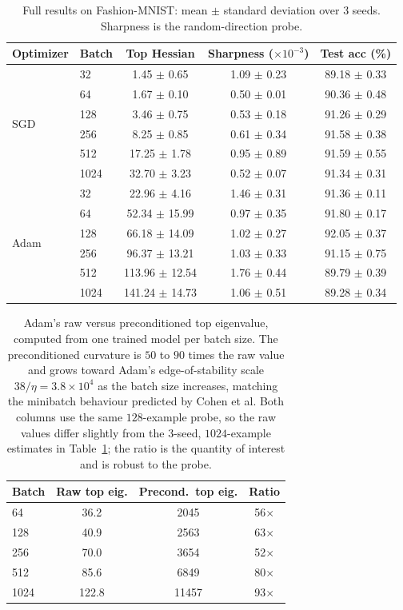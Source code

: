 \documentclass[a4paper,10pt,twoside]{article}
\begin{document}
\begin{table}[h]
\centering
\small
\begin{tabular}{llccc}
\toprule
Optimizer & Batch & Top Hessian & Sharpness ($\times10^{-3}$) & Test acc (\%) \\
\midrule
\multirow{6}{*}{SGD}
 & 32 & 1.45 $\pm$ 0.65 & 1.09 $\pm$ 0.23 & 89.18 $\pm$ 0.33 \\
 & 64 & 1.67 $\pm$ 0.10 & 0.50 $\pm$ 0.01 & 90.36 $\pm$ 0.48 \\
 & 128 & 3.46 $\pm$ 0.75 & 0.53 $\pm$ 0.18 & 91.26 $\pm$ 0.29 \\
 & 256 & 8.25 $\pm$ 0.85 & 0.61 $\pm$ 0.34 & 91.58 $\pm$ 0.38 \\
 & 512 & 17.25 $\pm$ 1.78 & 0.95 $\pm$ 0.89 & 91.59 $\pm$ 0.55 \\
 & 1024 & 32.70 $\pm$ 3.23 & 0.52 $\pm$ 0.07 & 91.34 $\pm$ 0.31 \\
\midrule
\multirow{6}{*}{Adam}
 & 32 & 22.96 $\pm$ 4.16 & 1.46 $\pm$ 0.31 & 91.36 $\pm$ 0.11 \\
 & 64 & 52.34 $\pm$ 15.99 & 0.97 $\pm$ 0.35 & 91.80 $\pm$ 0.17 \\
 & 128 & 66.18 $\pm$ 14.09 & 1.02 $\pm$ 0.27 & 92.05 $\pm$ 0.37 \\
 & 256 & 96.37 $\pm$ 13.21 & 1.03 $\pm$ 0.33 & 91.15 $\pm$ 0.75 \\
 & 512 & 113.96 $\pm$ 12.54 & 1.76 $\pm$ 0.44 & 89.79 $\pm$ 0.39 \\
 & 1024 & 141.24 $\pm$ 14.73 & 1.06 $\pm$ 0.51 & 89.28 $\pm$ 0.34 \\
\bottomrule
\end{tabular}
\caption{Full results on Fashion-MNIST: mean $\pm$ standard deviation over 3 seeds. Sharpness is the random-direction probe.}
\label{tab:results}
\end{table}

\begin{table}[h]
\centering
\small
\begin{tabular}{lccc}
\toprule
Batch & Raw top eig. & Precond.\ top eig. & Ratio \\
\midrule
64 & 36.2 & 2045 & 56$\times$ \\
128 & 40.9 & 2563 & 63$\times$ \\
256 & 70.0 & 3654 & 52$\times$ \\
512 & 85.6 & 6849 & 80$\times$ \\
1024 & 122.8 & 11457 & 93$\times$ \\
\bottomrule
\end{tabular}
\caption{Adam's raw versus preconditioned top eigenvalue, computed from one trained model per batch size. The preconditioned curvature is $50$ to $90$ times the raw value and grows toward Adam's edge-of-stability scale $38/\eta = 3.8\times10^{4}$ as the batch size increases, matching the minibatch behaviour predicted by Cohen et al. Both columns use the same $128$-example probe, so the raw values differ slightly from the $3$-seed, $1024$-example estimates in Table~\ref{tab:results}; the ratio is the quantity of interest and is robust to the probe.}
\label{tab:precond}
\end{table}
\end{document}
